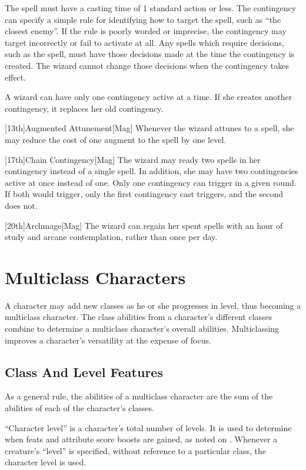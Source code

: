         The spell must have a casting time of 1 standard action or less.
        The contingency can specify a simple rule for identifying how to target the spell, such as ``the closest enemy''.
        If the rule is poorly worded or imprecise, the contingency may target incorrectly or fail to activate at all.
        Any spells which require decisions, such as the  spell, must have those decisions made at the time the contingency is created.
        The wizard cannot change those decisions when the contingency takes effect.

        A wizard can have only one contingency active at a time.
        If she creates another contingency, it replaces her old contingency.

        [13th]{Augmented Attunement}[Mag]
        Whenever the wizard attunes to a spell, she may reduce the cost of one augment to the spell by one level.

        [17th]{Chain Contingency}[Mag]
        The wizard may ready two spells in her contingency instead of a single spell.
        In addition, she may have two contingencies active at once instead of one.
        Only one contingency can trigger in a given round.
        If both would trigger, only the first contingency cast triggers, and the second does not.

        [20th]{Archmage}[Mag]
        The wizard can regain her spent spells with an hour of study and arcane contemplation, rather than once per day.

\section{Multiclass Characters}\label{Multiclass Characters}
    A character may add new classes as he or she progresses in level, thus becoming a multiclass character.
    The class abilities from a character's different classes combine to determine a multiclass character's overall abilities.
    Multiclassing improves a character's versatility at the expense of focus.

    \subsection{Class And Level Features}
        As a general rule, the abilities of a multiclass character are the sum
        of the abilities of each of the character's classes.

        ``Character level'' is a character's total number of levels.
        It is used to determine when feats and attribute score boosts are gained, as noted on .
        Whenever a creature's ``level'' is specified, without reference to a particular class, the character level is used.

